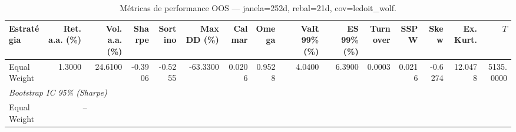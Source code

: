 \begin{table}[htbp]
  \centering
  \caption{Métricas de performance OOS — janela=252d, rebal=21d, cov=ledoit_wolf.}
  \label{tab:comparison_performance}
  \footnotesize
  \begin{tabular}{lrrrrrrrrrrrrrr}
  \toprule
  Estratégia & Ret. a.a. (\%) & Vol. a.a. (\%) & Sharpe & Sortino & Max DD (\%) & Calmar & Omega & VaR 99\% (\%) & ES 99\% (\%) & Turnover & SSPW & Skew & Ex. Kurt. & $T$ \\
  \midrule
  Equal Weight & 1.3000 & 24.6100 & -0.3906 & -0.5255 & -63.3300 & 0.0206 & 0.9528 & 4.0400 & 6.3900 & 0.0003 & 0.0216 & -0.6274 & 12.0478 & 5135.0000 \\
  \bottomrule
  \midrule
  \multicolumn{15}{l}{\textit{Bootstrap IC 95\% (Sharpe)}}
  \\
  Equal Weight & \multicolumn{2}{c}{--} \\
  \end{tabular}
\end{table}